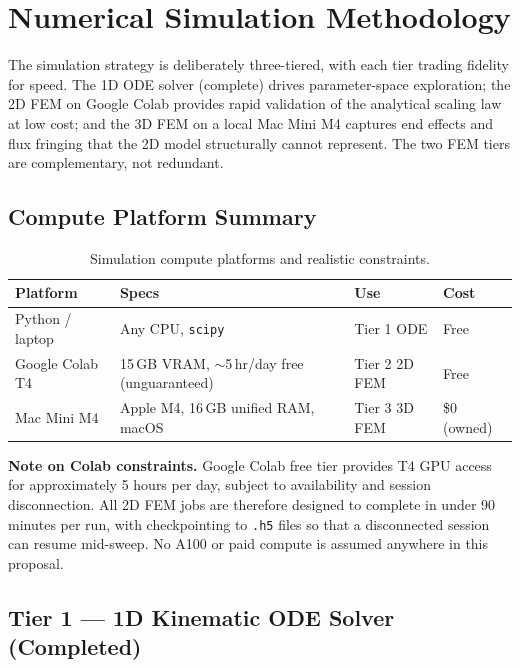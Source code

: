 \documentclass[12pt,letterpaper]{article}
\begin{document}
\section{Numerical Simulation Methodology}

The simulation strategy is deliberately three-tiered, with each tier trading
fidelity for speed. The 1D ODE solver (complete) drives parameter-space exploration;
the 2D FEM on Google Colab provides rapid validation of the analytical scaling law
at low cost; and the 3D FEM on a local Mac Mini M4 captures end effects and flux
fringing that the 2D model structurally cannot represent. The two FEM tiers are
complementary, not redundant.

\subsection{Compute Platform Summary}

\begin{table}[H]
\centering
\caption{Simulation compute platforms and realistic constraints.}
\label{tab:compute}
\begin{tabularx}{\textwidth}{lXll}
\toprule
\textbf{Platform} & \textbf{Specs} & \textbf{Use} & \textbf{Cost} \\
\midrule
Python / laptop & Any CPU, \texttt{scipy} & Tier 1 ODE & Free \\
Google Colab T4  & 15\,GB VRAM, $\sim$5\,hr/day free (unguaranteed) & Tier 2 2D FEM & Free \\
Mac Mini M4      & Apple M4, 16\,GB unified RAM, macOS & Tier 3 3D FEM & \$0 (owned) \\
\bottomrule
\end{tabularx}
\end{table}

\noindent\textbf{Note on Colab constraints.} Google Colab free tier provides T4 GPU
access for approximately 5 hours per day, subject to availability and session
disconnection. All 2D FEM jobs are therefore designed to complete in under 90 minutes
per run, with checkpointing to \texttt{.h5} files so that a disconnected session can
resume mid-sweep. No A100 or paid compute is assumed anywhere in this proposal.

\subsection{Tier 1 — 1D Kinematic ODE Solver (Completed)}
\end{document}
